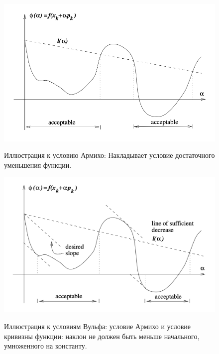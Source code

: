 \begin{enumerate}
    \begin{figure}[H]
            \centering
            \includegraphics[scale=0.5]{images/2-3-armijo.png}
            \label{ris:im225}
            \caption{Иллюстрация к условию Армихо:
            Накладывает условие достаточного уменьшения функции.}
            \endminipage\hfill
            \centering
            \includegraphics[scale=0.36]{images/2-3-wolfe.png}
            \label{ris:im225}
            \caption{Иллюстрация к условиям Вульфа: условие Армихо и
            условие кривизны функции: наклон не должен быть меньше начального, умноженного на константу.}
            \endminipage\hfill
    \end{figure}




\end{enumerate}
